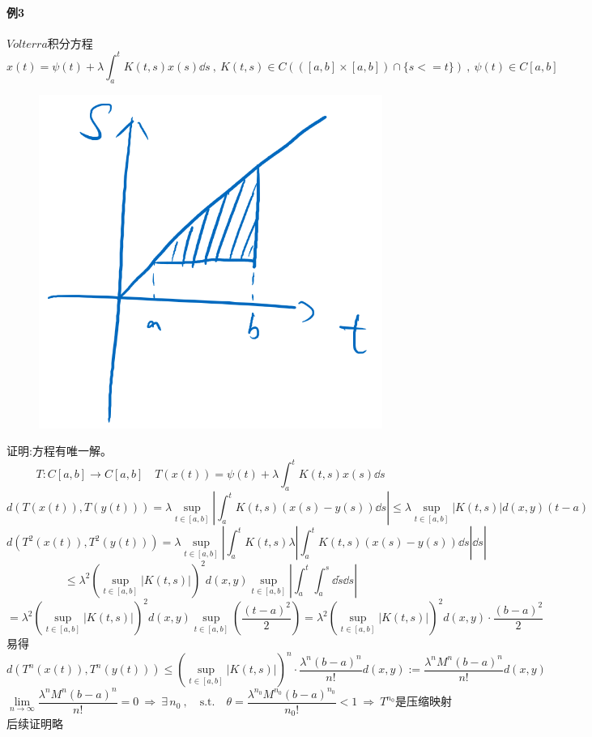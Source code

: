 \paragraph*{例3} \quad $Volterra$积分方程
\[x(t)=\psi(t)+\lambda\int_a^tK(t,s)x(s)\dd s \ , \ K(t,s) \in C(([a,b] \times [a,b])\cap\{s<=t\}) \ , \ \psi(t) \in C[a,b]\]
\begin{figure}[htbp]
    \center
    \includegraphics[scale=0.25]{./fig/2.1.5-1.png}
\end{figure}
证明:方程有唯一解。\\
\[T:C[a,b] \to C[a,b] \quad T(x(t))=\psi(t)+\lambda\int_a^tK(t,s)x(s)\dd s\]
\[d(T(x(t)),T(y(t)))=\lambda\mathop {\text{sup}}\limits_{t \in [a,b]}\left|\int_a^tK(t,s)(x(s)-y(s))\dd s\right| \leq \lambda\mathop {\text{sup}}\limits_{t \in [a,b]}\left|K(t,s)\right|d(x,y)(t-a)\]
\[d(T^2(x(t)),T^2(y(t)))=\lambda\mathop {\text{sup}}\limits_{t \in [a,b]}\left|\int_a^tK(t,s)\lambda\left|\int_a^tK(t,s)(x(s)-y(s))\dd s\right|\dd s\right|\]
\[\leq \lambda^2\left(\mathop {\text{sup}}\limits_{t \in [a,b]}\left|K(t,s)\right|\right)^2d(x,y)\mathop {\text{sup}}\limits_{t \in [a,b]}\left|\int_a^t\int_a^s\dd\tilde{s}\dd s\right|\]
\[=\lambda^2\left(\mathop {\text{sup}}\limits_{t \in [a,b]}\left|K(t,s)\right|\right)^2d(x,y)\mathop {\text{sup}}\limits_{t \in [a,b]}\left(\frac{(t-a)^2}{2}\right)=\lambda^2\left(\mathop {\text{sup}}\limits_{t \in [a,b]}\left|K(t,s)\right|\right)^2d(x,y) \cdot \frac{(b-a)^2}{2}\]
易得
\[d(T^n(x(t)),T^n(y(t))) \leq \left(\mathop {\text{sup}}\limits_{t \in [a,b]}\left|K(t,s)\right|\right)^n \cdot \frac{\lambda^n(b-a)^n}{n!}d(x,y):=\frac{\lambda^nM^n(b-a)^n}{n!}d(x,y)\]
\[\lim_{n \to \infty}\frac{\lambda^nM^n(b-a)^n}{n!}=0 \ \Rightarrow \ \exists \, n_0 \ , \quad \text{s.t.} \quad \theta=\frac{\lambda^{n_0}M^{n_0}(b-a)^{n_0}}{{n_0}!}<1 \ \Rightarrow \ T^{n_0}\text{是压缩映射}\]
后续证明略
